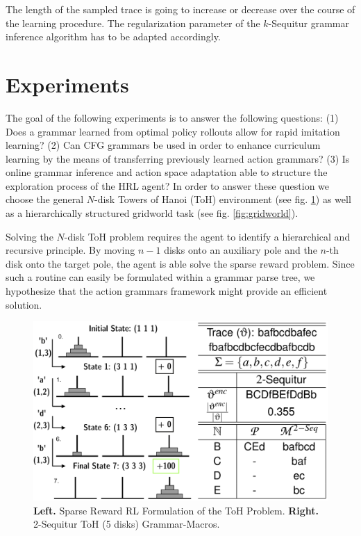 \documentclass[10pt,letterpaper]{article}
\begin{document}
The length of the sampled trace is going to increase or decrease over the course of the learning procedure. The regularization parameter of the $k$-Sequitur grammar inference algorithm has to be adapted accordingly.

\section{Experiments}

The goal of the following experiments is to answer the following questions: (1) Does a grammar learned from optimal policy rollouts allow for rapid imitation learning? (2) Can CFG grammars be used in order to enhance curriculum learning by the means of transferring previously learned action grammars? (3) Is online grammar inference and action space adaptation able to structure the exploration process of the HRL agent?
In order to answer these question we choose the general $N$-disk Towers of Hanoi (ToH) environment (see fig. \ref{fig:hanoi}) as well as a hierarchically structured gridworld task (see fig. \ref{fig:gridworld}).

Solving the $N$-disk ToH problem requires the agent to identify a hierarchical and recursive principle. By moving $n-1$ disks onto an auxiliary pole and the $n$-th disk onto the target pole, the agent is able solve the sparse reward problem. Since such a routine can easily be formulated within a grammar parse tree, we hypothesize that the action grammars framework might provide an efficient solution.


\begin{figure}[H]
    \centering
    \includegraphics[width=\linewidth]{figures/hanoi_grammar.png}
    \caption{\textbf{Left.} Sparse Reward RL Formulation of the ToH Problem. \textbf{Right.} 2-Sequitur ToH (5 disks) Grammar-Macros.}
    \label{fig:hanoi}
 \end{figure}
 
\end{document}
